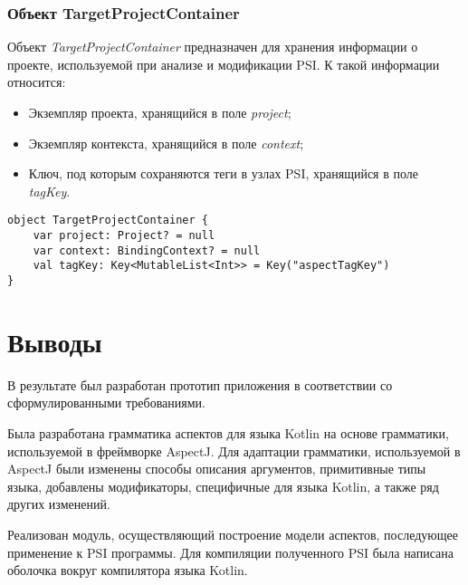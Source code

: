 \subsubsection{Объект TargetProjectContainer}
\label{ssub:TargetProjectContainer}
Объект \textit{TargetProjectContainer} предназначен для хранения информации о проекте, используемой при анализе и модификации PSI.
К такой информации относится:
\begin{itemize}
	\item Экземпляр проекта, хранящийся в поле \textit{project};
	\item Экземпляр контекста, хранящийся в поле \textit{context};
	\item Ключ, под которым сохраняются теги в узлах PSI, хранящийся в поле \textit{tagKey}.
\end{itemize}
\begin{lstlisting}[style={java}, label={lst:TargetProjectContainer},
  caption={Объект TargetProjectContainer}]
object TargetProjectContainer {
    var project: Project? = null
    var context: BindingContext? = null
    val tagKey: Key<MutableList<Int>> = Key("aspectTagKey")
}
\end{lstlisting}
\section{Выводы}
\label{sec:development_conclusion}
В результате был разработан прототип приложения в соответствии со сформулированными требованиями.

Была разработана грамматика аспектов для языка Kotlin на основе грамматики,
используемой в фреймворке AspectJ.
Для адаптации грамматики, используемой в AspectJ были изменены способы описания аргументов, примитивные типы языка, добавлены модификаторы, специфичные для языка Kotlin, а также ряд других изменений.

Реализован модуль, осуществляющий построение модели аспектов, последующее
применение к PSI программы.
Для компиляции полученного PSI была написана оболочка вокруг компилятора языка Kotlin.
